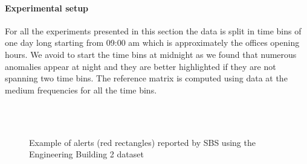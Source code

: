 \paragraph{Experimental setup}
For all the experiments presented in this section the data is split in time bins of one day long starting from 09:00 am which is approximately the offices opening hours.
We avoid to start the time bins at midnight as we found that numerous anomalies appear at night and they are better highlighted if they are not spanning two time bins.
The reference matrix is computed using data at the medium frequencies for all the time bins.

\begin{figure}[t]
   \hspace{.015\textwidth} %
   \hspace{.015\textwidth}  %
 \\ %
 \\  
\caption{Example of alerts (red rectangles) reported by SBS using the Engineering Building 2 dataset}
\end{figure}

